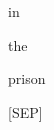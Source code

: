 \documentclass[varwidth=150mm]{standalone}
\begin{document}
\begin{CJK*}{UTF8}{gbsn}
{{{\colorbox{red!2.4244794845581055}{\strut in} \colorbox{red!9.495609283447266}{\strut the} \colorbox{red!6.4354095458984375}{\strut prison} \colorbox{red!12.551688194274902}{\strut [SEP]}
}}}
\end{CJK*}
\end{document}
